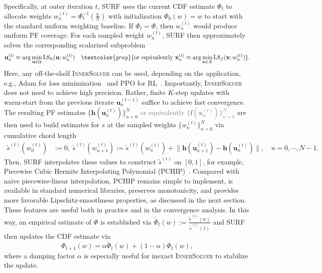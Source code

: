\documentclass{article}
\newcommand{\bx}{\mathbf{x}}
\newcommand{\bu}{\mathbf{u}}
\newcommand{\X}{\mathcal{X}}
\newcommand{\U}{\mathcal{U}}
\newcommand{\LS}{\operatorname{LS}}
\newcommand{\f}{\mathbf{f}}
\newcommand{\h}{\mathbf{h}}
\newcommand{\Farc}{\Phi}
\begin{document}
Specifically, at outer iteration $t$, SURF uses the current CDF estimate $\Farc_t$ to allocate weights $w_n^{(t)} = \Farc_t^{-1}\left(\frac{n}{N}\right)$ with initialization $\Farc_0(w)=w$ to start with the standard uniform weighting baseline. If $\Farc_t=\Farc$, then $w_n^{(t)}$ would produce uniform PF coverage. For each sampled weight $w_n^{(t)}$, SURF then approximately solves the corresponding scalarized subproblem
\begin{align}
\bu_n^{(t)}
\approx
\arg\min_{\bu\in\U}\LS_h(\bu;w_n^{(t)})
\quad
\textcolor{gray}{\text{or equivalently }
\bx_n^{(t)}
\approx
\arg\min_{\bx\in\X}\LS_f(\bx;w_n^{(t)})}. \label{eq:inner_objective}
\end{align}
Here, any off-the-shelf \textsc{InnerSolver} can be used, depending on the application, e.g., Adam for loss minimization~\citep{kingma2014adam} and PPO for RL~\citep{schulman2017proximal}. Importantly, \textsc{InnerSolver} does not need to achieve high precision. Rather, finite $K$-step updates with warm-start from the previous iterate $\bu_n^{(t-1)}$ suffice to achieve fast convergence. The resulting PF estimates $\{\h(\bu_n^{(t)})\}_{n=0}^N$ \textcolor{gray}{or equivalently $\{\f(\bx_n^{(t)})\}_{n=0}^N$} are then used to build estimates for $s$ at the sampled weights $\{w_n^{(t)}\}_{n=0}^N$ via cumulative chord length
\begin{align}
\tilde s^{(t)}(w_0^{(t)})&:=0,~
\tilde s^{(t)}(w_{n+1}^{(t)}):=
\tilde s^{(t)}(w_n^{(t)})
+
\big\|
\h(\bu_{n+1}^{(t)})-\h(\bu_n^{(t)})
\big\|,
\quad n=0,\cdots,N-1.
\label{eq:sw_tilde}
\end{align}
Then, SURF interpolates these values to construct $\tilde s^{(t)}$ on $[0,1]$, for example, Piecewise Cubic Hermite Interpolating Polynomial (PCHIP)~\citep{fritsch1980monotone}. Compared with naive piecewise-linear interpolation, PCHIP remains simple to implement, is available in standard numerical libraries, preserves monotonicity, and provides more favorable Lipschitz-smoothness properties, as discussed in the next section. These features are useful both in practice and in the convergence analysis.
In this way, an empirical estimate of $\Farc$ is established via $\tilde \Farc_t(w):=\frac{\tilde s^{(t)}(w)}{\tilde s^{(t)}(1)}$ and 
SURF then updates the CDF estimate via
\begin{equation}
\Farc_{t+1}(w)=\alpha \tilde \Farc_t(w)+(1-\alpha)\Farc_t(w),
\label{eq:surf_update}
\end{equation}
where a damping factor $\alpha$ is especially useful for inexact \textsc{InnerSolver} to stabilize the update.
\end{document}
